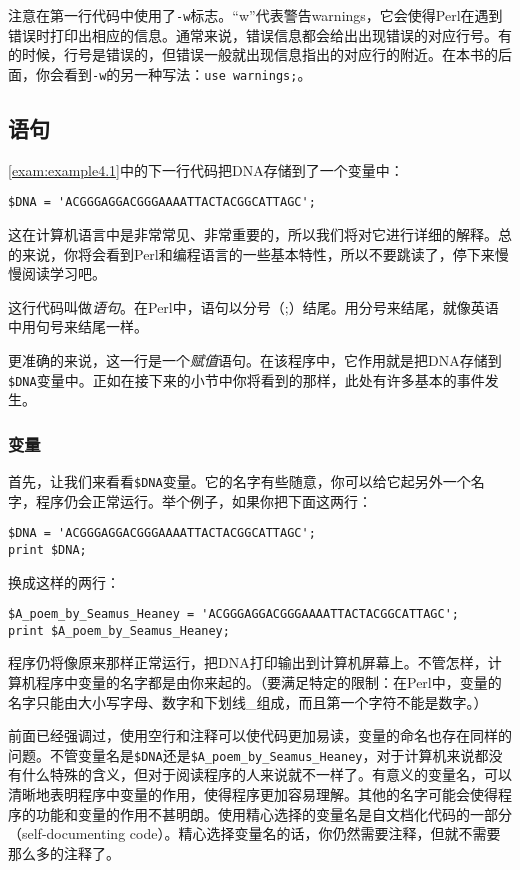 注意在第一行代码中使用了\verb|-w|标志。“w”代表警告warnings，它会使得Perl在遇到错误时打印出相应的信息。通常来说，错误信息都会给出出现错误的对应行号。有的时候，行号是错误的，但错误一般就出现信息指出的对应行的附近。在本书的后面，你会看到\verb|-w|的另一种写法：\verb|use warnings;|。

\subsection{语句}
\autoref{exam:example4.1}中的下一行代码把DNA存储到了一个变量中：

\begin{lstlisting}
$DNA = 'ACGGGAGGACGGGAAAATTACTACGGCATTAGC';
\end{lstlisting}

这在计算机语言中是非常常见、非常重要的，所以我们将对它进行详细的解释。总的来说，你将会看到Perl和编程语言的一些基本特性，所以不要跳读了，停下来慢慢阅读学习吧。

这行代码叫做\textit{语句}。在Perl中，语句以分号（;）结尾。用分号来结尾，就像英语中用句号来结尾一样。

更准确的来说，这一行是一个\textit{赋值}语句。在该程序中，它作用就是把DNA存储到\verb|$DNA|变量中。正如在接下来的小节中你将看到的那样，此处有许多基本的事件发生。

\subsubsection{变量}
首先，让我们来看看\verb|$DNA|变量。它的名字有些随意，你可以给它起另外一个名字，程序仍会正常运行。举个例子，如果你把下面这两行：

\begin{lstlisting}
$DNA = 'ACGGGAGGACGGGAAAATTACTACGGCATTAGC';
print $DNA;
\end{lstlisting}
换成这样的两行：

\begin{lstlisting}
$A_poem_by_Seamus_Heaney = 'ACGGGAGGACGGGAAAATTACTACGGCATTAGC';
print $A_poem_by_Seamus_Heaney;
\end{lstlisting}
程序仍将像原来那样正常运行，把DNA打印输出到计算机屏幕上。不管怎样，计算机程序中变量的名字都是由你来起的。（要满足特定的限制：在Perl中，变量的名字只能由大小写字母、数字和下划线\_组成，而且第一个字符不能是数字。）

前面已经强调过，使用空行和注释可以使代码更加易读，变量的命名也存在同样的问题。不管变量名是\verb|$DNA|还是\verb|$A_poem_by_Seamus_Heaney|，对于计算机来说都没有什么特殊的含义，但对于阅读程序的人来说就不一样了。有意义的变量名，可以清晰地表明程序中变量的作用，使得程序更加容易理解。其他的名字可能会使得程序的功能和变量的作用不甚明朗。使用精心选择的变量名是自文档化代码的一部分（self-documenting code）。精心选择变量名的话，你仍然需要注释，但就不需要那么多的注释了。

